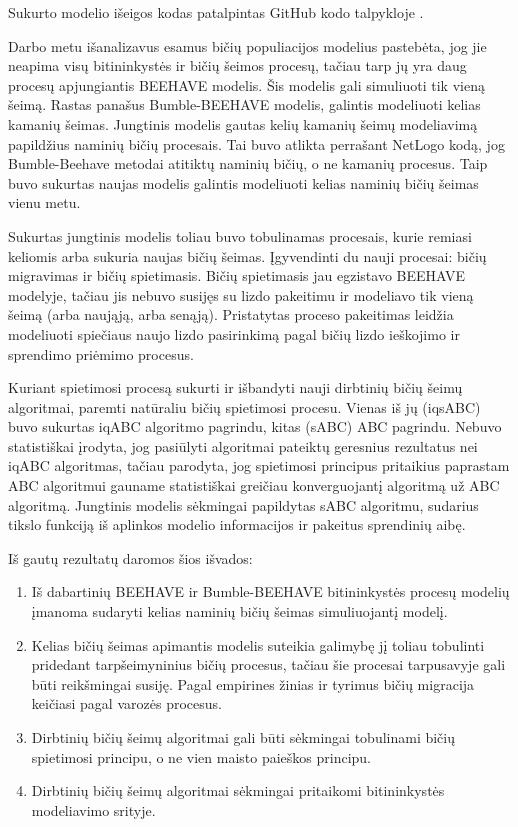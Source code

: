 \documentclass{VUMIFPSmagistrinis}
\begin{document}
Sukurto modelio išeigos kodas patalpintas GitHub kodo talpykloje \cite{Veg20}. 




Darbo metu išanalizavus  esamus bičių populiacijos modelius pastebėta, jog jie neapima visų bitininkystės ir bičių šeimos procesų, tačiau tarp jų yra daug procesų apjungiantis BEEHAVE modelis. Šis modelis gali simuliuoti tik vieną šeimą. Rastas panašus Bumble-BEEHAVE modelis, galintis modeliuoti kelias kamanių šeimas. Jungtinis modelis gautas kelių kamanių šeimų modeliavimą papildžius naminių bičių procesais. Tai buvo atlikta perrašant NetLogo kodą, jog Bumble-Beehave metodai atitiktų naminių bičių, o ne kamanių procesus. Taip buvo sukurtas naujas modelis galintis modeliuoti kelias naminių bičių šeimas vienu metu.

Sukurtas jungtinis modelis toliau buvo tobulinamas procesais, kurie remiasi keliomis arba sukuria naujas bičių šeimas. Įgyvendinti du nauji procesai: bičių migravimas ir bičių spietimasis. Bičių spietimasis jau egzistavo BEEHAVE modelyje, tačiau jis nebuvo susijęs su lizdo pakeitimu ir modeliavo tik vieną šeimą (arba naująją, arba senąją). Pristatytas proceso pakeitimas leidžia modeliuoti spiečiaus naujo lizdo pasirinkimą pagal bičių lizdo ieškojimo ir sprendimo priėmimo procesus.

Kuriant spietimosi procesą sukurti ir išbandyti nauji dirbtinių bičių šeimų algoritmai, paremti natūraliu bičių spietimosi procesu. Vienas iš jų (iqsABC) buvo sukurtas iqABC algoritmo pagrindu, kitas (sABC) ABC pagrindu. Nebuvo statistiškai įrodyta, jog pasiūlyti algoritmai pateiktų geresnius rezultatus nei iqABC algoritmas, tačiau parodyta, jog spietimosi principus pritaikius paprastam ABC algoritmui gauname statistiškai greičiau konverguojantį algoritmą už ABC algoritmą. Jungtinis modelis sėkmingai papildytas sABC algoritmu, sudarius tikslo funkciją iš aplinkos modelio informacijos ir pakeitus sprendinių aibę.

Iš gautų rezultatų daromos šios išvados:
\begin{enumerate}
    \item Iš dabartinių BEEHAVE ir Bumble-BEEHAVE bitininkystės procesų modelių įmanoma sudaryti kelias naminių bičių šeimas simuliuojantį modelį.
    \item Kelias bičių šeimas apimantis modelis suteikia galimybę jį toliau tobulinti pridedant tarpšeimyninius bičių procesus, tačiau šie procesai tarpusavyje gali būti reikšmingai susiję. Pagal empirines žinias ir tyrimus bičių migracija keičiasi pagal varozės procesus.
    \item Dirbtinių bičių šeimų algoritmai gali būti sėkmingai tobulinami bičių spietimosi principu, o ne vien maisto paieškos principu.
    \item Dirbtinių bičių šeimų algoritmai sėkmingai pritaikomi bitininkystės modeliavimo srityje.
\end{enumerate}
\end{document}
